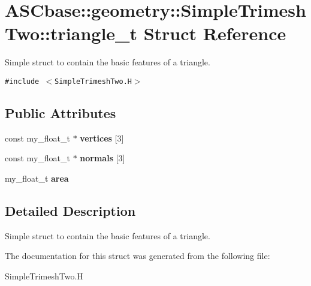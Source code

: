 \section{ASCbase::geometry::Simple\-Trimesh\-Two::triangle\_\-t Struct Reference}
\label{structASCbase_1_1geometry_1_1SimpleTrimeshTwo_1_1triangle__t}
Simple struct to contain the basic features of a triangle.  


{\tt \#include $<$Simple\-Trimesh\-Two.H$>$}

\subsection*{Public Attributes}
\begin{CompactItemize}
\item 
const my\_\-float\_\-t $\ast$ \textbf{vertices} [3]\label{structASCbase_1_1geometry_1_1SimpleTrimeshTwo_1_1triangle__t_40bf671476d2bf5b08a24073b81aa206}

\item 
const my\_\-float\_\-t $\ast$ \textbf{normals} [3]\label{structASCbase_1_1geometry_1_1SimpleTrimeshTwo_1_1triangle__t_0b7eb4d1a6f692324da8a703681e4cfc}

\item 
my\_\-float\_\-t \textbf{area}\label{structASCbase_1_1geometry_1_1SimpleTrimeshTwo_1_1triangle__t_27b8a68ae795adf52ba95a1b90cc0c6b}

\end{CompactItemize}


\subsection{Detailed Description}
Simple struct to contain the basic features of a triangle. 



The documentation for this struct was generated from the following file:\begin{CompactItemize}
\item 
Simple\-Trimesh\-Two.H\end{CompactItemize}
